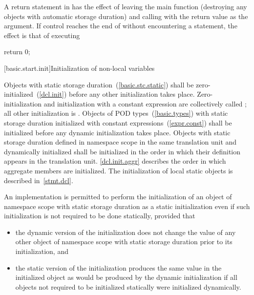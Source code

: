 \pnum
{}%
%
A return statement in  has the effect of leaving the main
function (destroying any objects with automatic storage duration) and
calling  with the return value as the argument. If
control reaches the end of  without encountering a
 statement, the effect is that of executing

\begin{codeblock}
return 0;
\end{codeblock}

[basic.start.init]{Initialization of non-local variables}

\pnum
{}%
%
%
%
%
Objects with static storage duration~(\ref{basic.stc.static})
shall be zero-initialized~(\ref{dcl.init}) before
any other initialization takes place.
%
Zero-initialization and initialization with a constant expression
are collectively called ; all other initialization is .
Objects of POD types~(\ref{basic.types}) with static storage duration
initialized with constant expressions~(\ref{expr.const}) shall be
initialized before any dynamic initialization takes place. Objects with
static storage duration defined in namespace scope in the same translation
unit and dynamically initialized shall be initialized in the order in which
their definition appears in the translation unit.
\enternote \ref{dcl.init.aggr} describes the order in which aggregate
members are initialized. The initialization of local static objects
is described in~\ref{stmt.dcl}. \exitnote

\pnum
An implementation is permitted to perform the initialization of an
object of namespace scope with static storage duration as a static
initialization even if such initialization is not required to be done
statically, provided that

\begin{itemize}
\item
the dynamic version of the initialization does not change the
value of any other object of namespace scope with static storage
duration prior to its initialization, and

\item
the static version of the initialization produces the same value
in the initialized object as would be produced by the dynamic
initialization if all objects not required to be initialized statically
were initialized dynamically.
\end{itemize}

